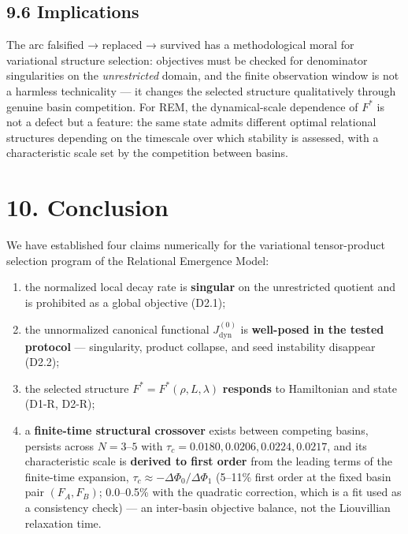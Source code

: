\documentclass[
]{article}
\providecommand{\tightlist}{%
  \setlength{\itemsep}{0pt}\setlength{\parskip}{0pt}}
\begin{document}
\subsection{9.6 Implications}\label{implications}

The arc falsified → replaced → survived has a methodological moral for
variational structure selection: objectives must be checked for
denominator singularities on the \emph{unrestricted} domain, and the
finite observation window is not a harmless technicality --- it changes
the selected structure qualitatively through genuine basin competition.
For REM, the dynamical-scale dependence of \(F^*\) is not a defect but a
feature: the same state admits different optimal relational structures
depending on the timescale over which stability is assessed, with a
characteristic scale set by the competition between basins.

\section{10. Conclusion}\label{conclusion}

We have established four claims numerically for the variational
tensor-product selection program of the Relational Emergence Model:

\begin{enumerate}
\def\labelenumi{\arabic{enumi}.}
\tightlist
\item
  the normalized local decay rate is \textbf{singular} on the
  unrestricted quotient and is prohibited as a global objective (D2.1);
\item
  the unnormalized canonical functional \(J_{\mathrm{dyn}}^{(0)}\) is
  \textbf{well-posed in the tested protocol} --- singularity, product
  collapse, and seed instability disappear (D2.2);
\item
  the selected structure \(F^* = F^*(\rho, L, \lambda)\)
  \textbf{responds} to Hamiltonian and state (D1-R, D2-R);
\item
  a \textbf{finite-time structural crossover} exists between competing
  basins, persists across \(N = 3\text{–}5\) with
  \(\tau_c = 0.0180, 0.0206, 0.0224,
  0.0217\), and its characteristic scale is \textbf{derived to first
  order} from the leading terms of the finite-time expansion,
  \(\tau_c \approx
  -\Delta\Phi_0/\Delta\Phi_1\) (5--11\% first order at the fixed basin
  pair \((F_A,F_B)\); 0.0--0.5\% with the quadratic correction, which is
  a fit used as a consistency check) --- an inter-basin objective
  balance, not the Liouvillian relaxation time.
\end{enumerate}
\end{document}
